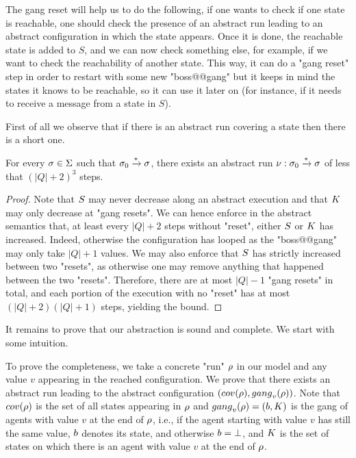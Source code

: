 The gang reset will help us to do the following, if one wants to check if one state is reachable, one should check the presence of an abstract run leading to an abstract configuration in which the state appears. Once it is done, the reachable state is added to $S$, and we can  now check something else, for example, if we want to check the reachability of another state. This way, it can do a "gang reset" step in order to restart with some new "boss@@gang" but it keeps in mind the states it knows to be reachable, so it can use it later on (for instance, if it needs to receive a message from a state in $S$).

First of all we observe that if there is an abstract run covering a state then there is a short one.

\begin{lemma}
	\label{lem:short-run}
	For every $\sigma \in \Sigma$ such that $\sigma_0 \xrightarrow{*} \sigma$, there exists an abstract run $\nu: \sigma_0 \xrightarrow{*} \sigma$ of less that $(|Q|+2)^3$ steps.
\end{lemma}

\ifproofs
\begin{proof}
	Note that $S$ may never decrease along an abstract execution and that $\clique$ may only decrease at "gang resets".
	We can hence enforce in the abstract semantics that, at least every $|Q|+2$ steps without "reset", either $S$ or $\clique$ has increased. Indeed, otherwise the configuration has looped as the "boss@@gang" may only take $|Q| +1$ values. We may also enforce that $S$ has strictly increased between two "resets", as otherwise one may remove anything that happened between the two "resets". Therefore, there are at most $|Q|-1$ "gang resets" in total, and each portion of the execution with no "reset" has at most $(|Q|+2)(|Q|+1)$ steps, yielding the bound. 
\end{proof}
\fi

It remains to prove that our abstraction is sound and complete. We start with some intuition.

To prove the completeness, we take a concrete "run" $\rho$ in our model and any value $v$ appearing in the reached configuration. We prove that there exists an abstract run leading to the abstract configuration $(\statesin{\run}, \gangof{v}{\run})$. Note that $\statesin{\run}$ is the set of all states appearing in $\rho$ and $\gangof{v}{\run} = (\boss, \clique)$ is the gang of agents with value $v$ at the end of $\rho$, i.e., if the agent starting with value $v$ has still the same value, $\boss$ denotes its state, and otherwise $\boss = \bot$, and $\clique$ is the set of states on which there is an agent with value $v$ at the end of $\rho$.

